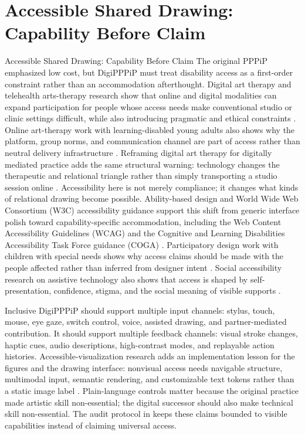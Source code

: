 \documentclass[
  ignorenonframetext,
]{beamer}
\author{\texorpdfstring{}{}}
\date{}
\begin{document}
\section{Accessible Shared Drawing: Capability Before
Claim}\label{sec:accessibility}

\begin{frame}{Accessible Shared Drawing:
Capability Before Claim}
The original PPPiP emphasized low cost, but DigiPPPiP must treat
disability access as a first-order constraint rather than an
accommodation afterthought. Digital art therapy and telehealth
arts-therapy research show that online and digital modalities can expand
participation for people whose access needs make conventional studio or
clinic settings difficult, while also introducing pragmatic and ethical
constraints . Online art-therapy work with learning-disabled
young adults also shows why the platform, group norms, and communication
channel are part of access rather than neutral delivery infrastructure
. Reframing digital art therapy for digitally
mediated practice adds the same structural warning: technology changes
the therapeutic and relational triangle rather than simply transporting
a studio session online . Accessibility here
is not merely compliance; it changes what kinds of relational drawing
become possible. Ability-based design and World Wide Web Consortium
(W3C) accessibility guidance support this shift from generic interface
polish toward capability-specific accommodation, including the Web
Content Accessibility Guidelines (WCAG) and the Cognitive and Learning
Disabilities Accessibility Task Force guidance (COGA)
. Participatory
design work with children with special needs shows why access claims
should be made with the people affected rather than inferred from
designer intent . Social
accessibility research on assistive technology also shows that access is
shaped by self-presentation, confidence, stigma, and the social meaning
of visible supports .

Inclusive DigiPPPiP should support multiple input channels: stylus,
touch, mouse, eye gaze, switch control, voice, assisted drawing, and
partner-mediated contribution. It should support multiple feedback
channels: visual stroke changes, haptic cues, audio descriptions,
high-contrast modes, and replayable action histories.
Accessible-visualization research adds an implementation lesson for the
figures and the drawing interface: nonvisual access needs navigable
structure, multimodal input, semantic rendering, and customizable text
tokens rather than a static image label . Plain-language controls matter because the
original practice made artistic skill non-essential; the digital
successor should also make technical skill non-essential. The audit
protocol in  keeps these claims bounded to
visible capabilities instead of claiming universal access.


\end{frame}
\end{document}
